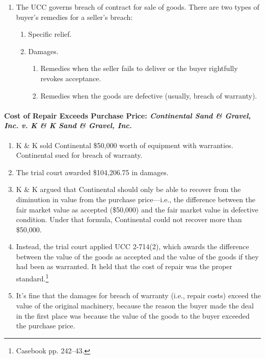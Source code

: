 \begin{enumerate}
    \item The UCC governs breach of contract for sale of goods. There are two 
    types of buyer's remedies for a seller's breach:
    \begin{enumerate}
        \item Specific relief.
        \item Damages.
        \begin{enumerate}
            \item Remedies when the seller fails to deliver or the buyer 
            rightfully revokes acceptance.
            \item Remedies when the goods are defective (usually, breach of 
            warranty).
        \end{enumerate}
    \end{enumerate}
\end{enumerate}

\paragraph{Cost of Repair Exceeds Purchase Price: \emph{Continental Sand \& 
Gravel, Inc. v. K \& K Sand \& Gravel, Inc.}}

\begin{enumerate}
    \item K \& K sold Continental \$50,000 worth of equipment with warranties. 
    Continental sued for breach of warranty.
    \item The trial court awarded \$104,206.75 in damages.
    \item K \& K argued that Continental should only be able to recover from 
    the diminution in value from the purchase price---i.e., the difference 
    between the fair market value as accepted (\$50,000) and the fair market 
    value in defective condition. Under that formula, Continental could not 
    recover more than \$50,000.
    \item Instead, the trial court applied UCC 2-714(2), which awards the 
    difference between the value of the goods as accepted and the value of the 
    goods if they had been as warranted. It held that the cost of repair was 
    the proper standard.\footnote{Casebook pp. 242--43.}
    \item It's fine that the damages for breach of warranty (i.e., repair 
    costs) exceed the value of the original machinery, because the reason the 
    buyer made the deal in the first place was because the value of the goods 
    to the buyer exceeded the purchase price.
\end{enumerate}

